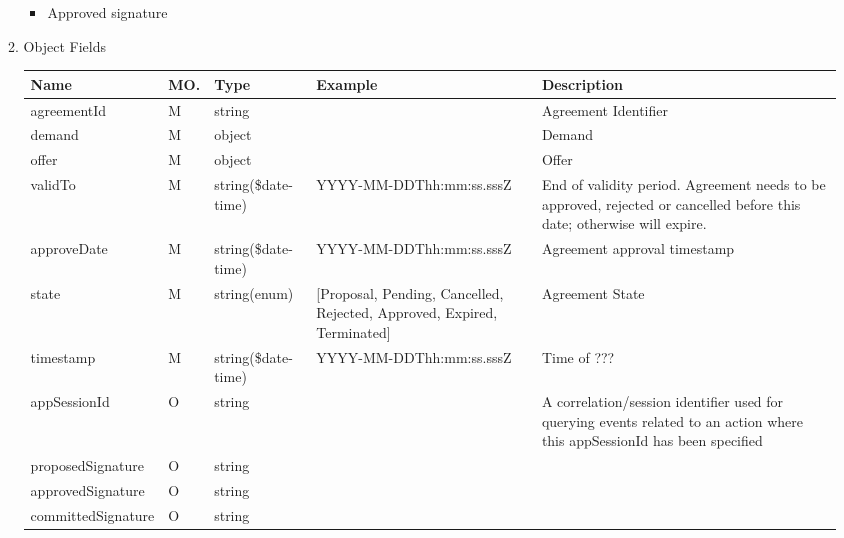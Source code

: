 \begin{enumerate}
\begin{enumerate}
\begin{itemize}
\item Approved signature

\end{itemize}

\item Object Fields

\begin{center}
\begin{tabular}{|p{3cm}|l|p{3cm}|p{3cm}|p{4cm}|} 
\hline
\rowcolor{lightgray}	Name	& MO.	& Type	& Example & 	Description \\
\hline

agreementId			& M & string 				&				& 	Agreement Identifier \\
\hline

demand				& M	& object 				&				& 	Demand		\\
\hline

offer 				& M & object 				& 				& 	Offer 		\\
\hline

validTo				& M & string(\$date-time)	& YYYY-MM-DDThh:mm:ss.sssZ & End of validity period. 
																			Agreement needs to be approved, rejected or cancelled before this date; 
																			otherwise will expire. \\
\hline

approveDate			& M & string(\$date-time)	& YYYY-MM-DDThh:mm:ss.sssZ & Agreement approval timestamp \\
\hline

state 				& M & string(enum) 				&[Proposal, Pending, Cancelled, Rejected, Approved, Expired, Terminated] & Agreement State \\
\hline

timestamp			& M	& 	string(\$date-time)	& YYYY-MM-DDThh:mm:ss.sssZ	&	Time of ???  \\
\hline

appSessionId		& O &	string 				&							& 	A correlation/session identifier used for querying events related to an action 
																				where this appSessionId has been specified		\\
\hline

proposedSignature 	& O & 	string 				&							&			\\
\hline

approvedSignature 	& O & 	string 				& 							&			\\
\hline

committedSignature	& O &	string 				& 							& 			\\
\hline


\end{tabular}
\end{center}
\end{enumerate}
\end{enumerate}
